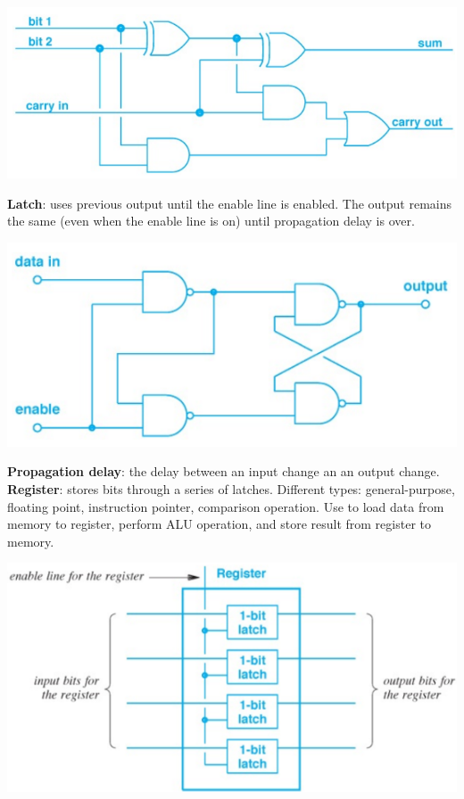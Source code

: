 \documentclass[10pt,landscape]{article}
\begin{document}
\begin{multicols}{3}
{\centering\includegraphics[scale=0.28]{img/fad.png}\par} 
\textbf{Latch}: uses previous output until the enable line is enabled. The output remains the same (even when the enable line is on) until propagation delay is over.\\
{\centering\includegraphics[scale=0.3]{img/l.png}\par}
\textbf{Propagation delay}: the delay between an input change an an output change.\\
\textbf{Register}: stores bits through a series of latches. Different types: general-purpose, floating point, instruction pointer, comparison operation. Use to load data from memory to register, perform ALU operation, and store result from register to memory. \\
{\centering\includegraphics[scale=0.4]{img/register.png}\par}

\end{multicols}
\end{document}
